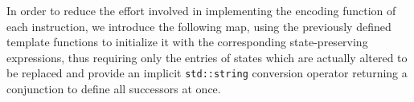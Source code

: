 In order to reduce the effort involved in implementing the encoding function of each instruction, we introduce the following map,
using the previously defined template functions to initialize it with the corresponding state-preserving expressions,
thus requiring only the entries of states which are actually altered to be replaced
and provide an implicit \lstinline[style=c++]{std::string} conversion operator returning a conjunction to define all successors at once.


